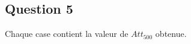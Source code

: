 \documentclass[10pt]{report}
\begin{document}
\subsection{Question 5}
Chaque case contient la valeur de $Att_{500}$ obtenue.\newline
\end{document}
